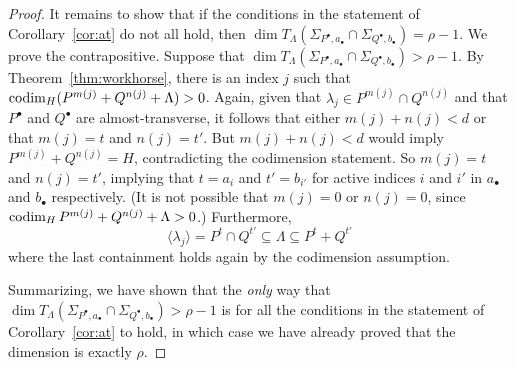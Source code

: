 \documentclass{amsart}
\begin{document}
\begin{proof}
It remains to show that if the conditions in the statement of Corollary~\ref{cor:at} do not all hold, then $\dim T_\Lambda  (\Sigma_{P^{\bullet},a_{\bullet}} \cap \Sigma_{Q^{\bullet},b_{\bullet}})= \rho-1.$  We prove the contrapositive. Suppose that $\dim T_\Lambda  (\Sigma_{P^{\bullet},a_{\bullet}} \cap \Sigma_{Q^{\bullet},b_{\bullet}})>\rho-1.$  By Theorem~\ref{thm:workhorse}, there is an index $j$ such that $\operatorname{codim}_H (P^{m(j)} + Q^{n(j)} + \Lambda) >0$.  Again, given that $\lambda_j \in P^{m(j)} \cap Q^{n(j)}$ and that $P^\bullet$ and $Q^\bullet$ are almost-transverse, it follows that either $m(j)+n(j)<d$ or that $m(j)=t$ and $n(j)=t'$.  But $m(j)+n(j)<d$ would imply $P^{m(j)} + Q^{n(j)} = H$, contradicting the codimension statement. So $m(j)=t$ and $n(j)=t'$, implying that $t=a_i$ and $t'=b_{i'}$ for active indices $i$ and $i'$ in $a_{\bullet}$ and $b_{\bullet}$ respectively.
(It is not possible that $m(j) = 0$ or $n(j) = 0$, since $\operatorname{codim}_H P^{m(j)}+Q^{n(j)}+\Lambda>0$.)
Furthermore, 
$$\langle \lambda_j \rangle = P^t\cap Q^{t'} \subseteq \Lambda \subseteq P^t + Q^{t'}$$
where the last containment holds again by the codimension assumption. 

Summarizing, we have shown that the {\em only} way that $\dim T_\Lambda  (\Sigma_{P^{\bullet},a_{\bullet}} \cap \Sigma_{Q^{\bullet},b_{\bullet}})> \rho-1$ is for all the conditions in the statement of Corollary~\ref{cor:at} to hold, in which case we have already proved that the dimension is exactly $\rho$.
\end{proof}
\end{document}
